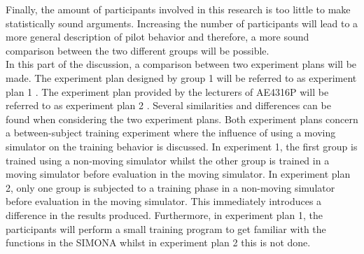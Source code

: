 \documentclass[conference]{IEEEtran}
\begin{document}


Finally, the amount of participants involved in this research is too little to make statistically sound arguments. Increasing the number of participants will lead to a more general description of pilot behavior and therefore, a more sound comparison between the two different groups will be possible. \\














In this part of the discussion, a comparison between two experiment plans will be made. The experiment plan designed by group 1 will be referred to as experiment plan 1 \cite{ref:experimentplan}. The experiment plan provided by the lecturers of AE4316P will be referred to as experiment plan 2 \cite{experimentplan}. Several similarities and differences can be found when considering the two experiment plans. Both experiment plans concern a between-subject training experiment where the influence of using a moving simulator on the training behavior is discussed. In experiment 1, the first group is trained using a non-moving simulator whilst the other group is trained in a moving simulator before evaluation in the moving simulator. In experiment plan 2, only one group is subjected to a training phase in a non-moving simulator before evaluation in the moving simulator. This immediately introduces a difference in the results produced. Furthermore, in experiment plan 1, the participants will perform a small training program to get familiar with the functions in the SIMONA whilst in experiment plan 2 this is not done. \\
\end{document}
